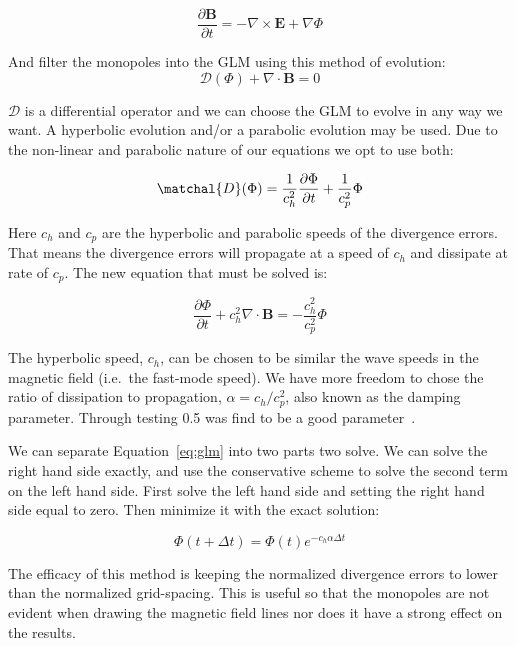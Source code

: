 \documentclass[12pt,upcase]{umlthesis}
\begin{document}
\begin{equation}
	\frac{\partial\textbf{B}}{\partial t} = - \nabla\times\textbf{E} + \nabla \Phi
\end{equation}

And filter the monopoles into the GLM using this method of evolution:
\begin{equation}
	\mathcal{D}(\Phi) + \nabla\cdot\textbf{B} = 0
\end{equation}

$\mathcal{D}$ is a differential operator and we can choose the GLM to evolve in any way we want. A hyperbolic evolution and/or a parabolic evolution may be used. Due to the non-linear and parabolic nature of our equations we opt to use both:

\begin{equation}
	\matchal{D}(\Phi) = \frac{1}{c^2_h}\frac{\partial\Phi}{\partial t} + \frac{1}{c^2_p}\Phi
\end{equation}

Here $c_h$ and $c_p$ are the hyperbolic and parabolic speeds of the divergence errors. That means the divergence errors will propagate at a speed of $c_h$ and dissipate at rate of $c_p$. The new equation that must be solved is:

\begin{equation}\label{eq:glm}
	\frac{\partial\Phi}{\partial t} + c^2_h \nabla\cdot\textbf{B} = - \frac{c^2_h}{c^2_p} \Phi
\end{equation}

The hyperbolic speed, $c_h$, can be chosen to be similar the wave speeds in the magnetic field (i.e.\ the fast-mode speed). We have more freedom to chose the ratio of dissipation to propagation, $\alpha = c_h / c^2_p$, also known as the damping parameter. Through testing 0.5 was find to be a good parameter~\citep[p. 5899-5911]{glm2}.

We can separate Equation~\ref{eq:glm} into two parts two solve. We can solve the right hand side exactly, and use the conservative scheme to solve the second term on the left hand side. First solve the left hand side and setting the right hand side equal to zero. Then minimize it with the exact solution:

\begin{equation}
	\Phi(t+\Delta t) = \Phi(t) e^{-c_h\alpha\Delta t}
\end{equation}

The efficacy of this method is keeping the normalized divergence errors to lower than the normalized grid-spacing. This is useful so that the monopoles are not evident when drawing the magnetic field lines nor does it have a strong effect on the results.
\end{document}
